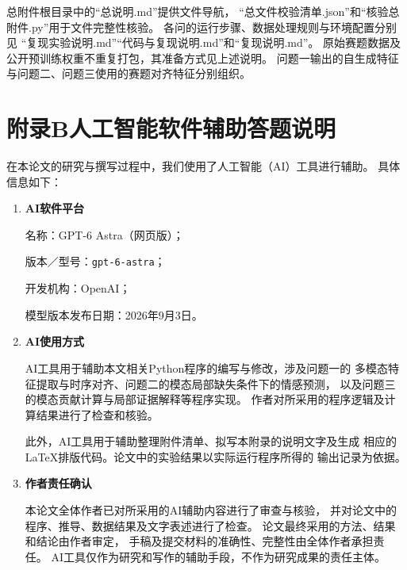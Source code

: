 总附件根目录中的“总说明.md”提供文件导航，
“总文件校验清单.json”和“核验总附件.py”用于文件完整性核验。
各问的运行步骤、数据处理规则与环境配置分别见
“复现实验说明.md”“代码与复现说明.md”和“复现说明.md”。
原始赛题数据及公开预训练权重不重复打包，其准备方式见上述说明。
问题一输出的自生成特征与问题二、问题三使用的赛题对齐特征分别组织。

\clearpage
\section*{附录B\quad 人工智能软件辅助答题说明}

在本论文的研究与撰写过程中，我们使用了人工智能（AI）工具进行辅助。
具体信息如下：

\begin{enumerate}
  \item \textbf{AI软件平台}

  名称：GPT-6 Astra（网页版）；

  版本／型号：\texttt{gpt-6-astra}；

  开发机构：OpenAI；

  模型版本发布日期：2026年9月3日。


  \item \textbf{AI使用方式}

  AI工具用于辅助本文相关Python程序的编写与修改，涉及问题一的
  多模态特征提取与时序对齐、问题二的模态局部缺失条件下的情感预测，
  以及问题三的模态贡献计算与局部证据解释等程序实现。
  作者对所采用的程序逻辑及计算结果进行了检查和核验。

  此外，AI工具用于辅助整理附件清单、拟写本附录的说明文字及生成
  相应的\LaTeX{}排版代码。论文中的实验结果以实际运行程序所得的
  输出记录为依据。

  \item \textbf{作者责任确认}

  本论文全体作者已对所采用的AI辅助内容进行了审查与核验，
  并对论文中的程序、推导、数据结果及文字表述进行了检查。
  论文最终采用的方法、结果和结论由作者审定，
  手稿及提交材料的准确性、完整性由全体作者承担责任。
  AI工具仅作为研究和写作的辅助手段，不作为研究成果的责任主体。
\end{enumerate}
